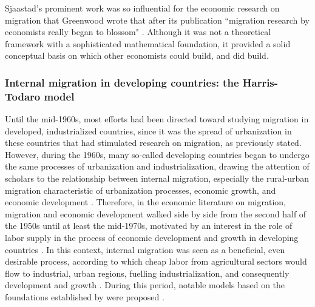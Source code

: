 Sjaastad's prominent work was so influential for the economic research on migration that Greenwood wrote that after its publication ``migration research by economists really began to blossom" \citep[p. 669]{greenwood_internal_1997}. Although it was not a theoretical framework with a sophisticated mathematical foundation, it provided a solid conceptual basis on which other economists could build, and did build.

\subsubsection{Internal migration in developing countries: the Harris-Todaro model} \label{lit_review_theories_HT}

Until the mid-1960s, most efforts had been directed toward studying migration in developed, industrialized countries, since it was the spread of urbanization in these countries that had stimulated research on migration, as previously stated. However, during the 1960s, many so-called developing countries began to undergo the same processes of urbanization and industrialization, drawing the attention of scholars to the relationship between internal migration, especially the rural-urban migration characteristic of urbanization processes, economic growth, and economic development \citep{lewis_economic_1954, ranis_theory_1961, easterlin_internal_1980}. Therefore, in the economic literature on migration, migration and economic development walked side by side from the second half of the 1950s until at least the mid-1970s, motivated by an interest in the role of labor supply in the process of economic development and growth in developing countries \citep{lewis_economic_1954, ranis_theory_1961}. In this context, internal migration was seen as a beneficial, even desirable process, according to which cheap labor from agricultural sectors would flow to industrial, urban regions, fuelling industrialization, and consequently development and growth \citep{easterlin_internal_1980}. During this period, notable models based on the foundations established by \cite{sjaastad_costs_1962} were proposed \citep{lucas_internal_1997}.

